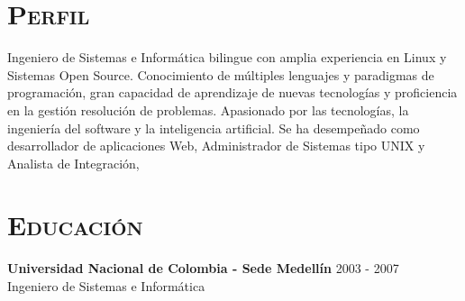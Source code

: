 \begin{resume}


\section{\textsc{Perfil}}
Ingeniero de Sistemas e Inform\'{a}tica bilingue con amplia
experiencia en Linux y Sistemas Open Source.  Conocimiento de m\'{u}ltiples
lenguajes y paradigmas de programaci\'{o}n, gran capacidad de
aprendizaje de nuevas tecnolog\'{i}as y proficiencia en la gesti\'{o}n
resoluci\'{o}n de problemas.  Apasionado por las tecnolog\'{i}as, la
ingenier\'{i}a del software y la inteligencia artificial. Se ha desempeñado como desarrollador de aplicaciones
Web, Administrador de Sistemas tipo UNIX y Analista de
Integraci\'{o}n, 




\section{\textsc{Educaci\'{o}n}}
\textbf{Universidad Nacional de Colombia  - Sede  Medell\'{i}n} \hfill 2003 - 2007 \\
{Ingeniero de Sistemas e Inform\'{a}tica } \hfill


\end{resume}
